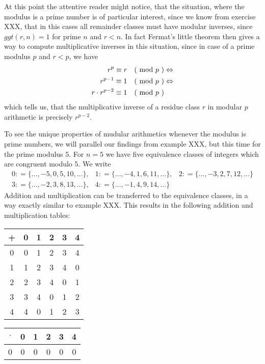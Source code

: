 At this point the attentive reader might notice, that the situation, where the modulus is a prime number is of particular interest, since we know from exercise XXX, that in this cases all remainder classes must have modular inverses, since $ggt(r,n)=1$ for prime $n$ and $r<n$. In fact Fermat's little theorem then gives a way to compute multiplicative inverses in this situation, since in case of a prime modulus $p$ and $r<p$, we have
\begin{align*}
r^p \equiv r \quad \text{( mod } p \text{ )} & \Leftrightarrow \\
r^{p-1} \equiv 1 \quad \text{( mod } p \text{ )} & \Leftrightarrow \\
r\cdot r^{p-2} \equiv 1 \quad \text{( mod } p \text{ )}
\end{align*}
which tells us, that the multiplicative inverse of a residue class $r$ in modular $p$ arithmetic is precisely $r^{p-2}$.
\begin{example}  
\label{primfield_z_5}
To see the unique properties of mudular arithmetics whenever the modulus is prime numbers, we will parallel our findings from example XXX, but this time for the prime modulus $5$.
For $ n = 5 $ we have five equivalence classes of integers which are congruent modulo $ 5 $. We write
$$
\begin{array}{ccc}
0: = \{\ldots, -5,0,5,10, \ldots \}, &
1: = \{\ldots, -4,1,6,11, \ldots \}, &
2: = \{\ldots, -3,2,7,12, \ldots \} \\
3: = \{\ldots, -2,3,8,13, \ldots \}, &
4: = \{\ldots, -1,4,9,14, \ldots \}
\end{array}
$$
Addition and multiplication can be transferred to the equivalence classes, in a way exactly similar to example XXX. This results in the following addition and multiplication tables:
\begin{center}
  \begin{tabular}{c | c c c c c}
    + & 0 & 1 & 2 & 3 & 4 \\\hline
    0 & 0 & 1 & 2 & 3 & 4 \\
    1 & 1 & 2 & 3 & 4 & 0 \\
    2 & 2 & 3 & 4 & 0 & 1 \\
    3 & 3 & 4 & 0 & 1 & 2 \\
    4 & 4 & 0 & 1 & 2 & 3 \\
  \end{tabular} \quad \quad \quad \quad
  \begin{tabular}{c | c c c c c}
$ \cdot $ & 0 & 1 & 2 & 3 & 4 \\\hline
      0 & 0 & 0 & 0 & 0 & 0 \\

\end{tabular}
\end{center}
\end{example}
